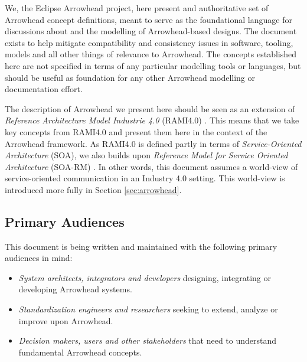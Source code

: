 %
%

We, the Eclipse Arrowhead project, here present and authoritative set of Arrowhead concept definitions, meant to serve as the foundational language for discussions about and the modelling of Arrowhead-based designs.
The document exists to help mitigate compatibility and consistency issues in software, tooling, models and all other things of relevance to Arrowhead.
The concepts established here are not specified in terms of any particular modelling tools or languages, but should be useful as foundation for any other Arrowhead modelling or documentation effort.

The description of Arrowhead we present here should be seen as an extension of \textit{Reference Architecture Model Industrie 4.0} (RAMI4.0) \cite{adolphs2016reference}.
This means that we take key concepts from RAMI4.0 and present them here in the context of the Arrowhead framework.
As RAMI4.0 is defined partly in terms of \textit{Service-Oriented Architecture} (SOA), we also builds upon \textit{Reference Model for Service Oriented Architecture} (SOA-RM) \cite{mackenzie2006reference}.
In other words, this document assumes a world-view of service-oriented communication in an Industry 4.0 setting.
This world-view is introduced more fully in Section \ref{sec:arrowhead}.

\subsection{Primary Audiences}
\label{sec:introduction:audiences}

This document is being written and maintained with the following primary audiences in mind:

\begin{itemize}
\item \textit{System architects, integrators and developers} designing, integrating or developing Arrowhead systems.
\item \textit{Standardization engineers and researchers} seeking to extend, analyze or improve upon Arrowhead.
\item \textit{Decision makers, users and other stakeholders} that need to understand fundamental Arrowhead concepts.
\end{itemize}


